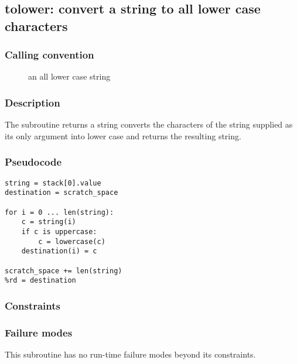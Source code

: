 \clearpage
{}
{}
\label{subr:tolower}
\subsection*{tolower: convert a string to all lower case characters}

\subsubsection*{Calling convention}

\begin{description}
\item[] an all lower case string
\end{description}

\subsubsection*{Description}

The  subroutine returns a string converts the
characters of the string supplied as its only argument into lower case
and returns the resulting string.

\subsubsection*{Pseudocode}

\begin{verbatim}
string = stack[0].value
destination = scratch_space

for i = 0 ... len(string):
    c = string(i)
    if c is uppercase:
        c = lowercase(c)
    destination(i) = c

scratch_space += len(string)
%rd = destination
\end{verbatim}

\subsubsection*{Constraints}

\subsubsection*{Failure modes}

This subroutine has no run-time failure modes beyond its constraints.
